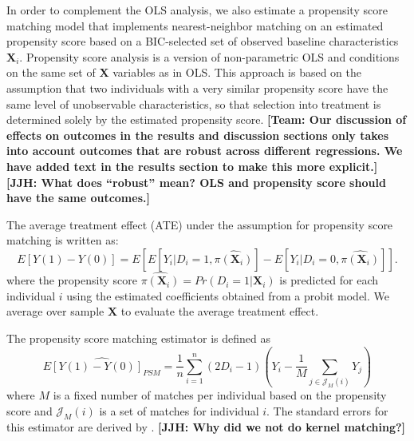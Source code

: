 In order to complement the OLS analysis, we also estimate a propensity score matching model that implements nearest-neighbor matching on an estimated propensity score based on a BIC-selected set of observed baseline characteristics $\boldsymbol{X}_i$. Propensity score analysis is a version of non-parametric OLS and conditions on the same set of $\bm{X}$ variables as in OLS. This approach is based on the assumption that two individuals with a very similar propensity score have the same level of unobservable characteristics, so that selection into treatment is determined solely by the estimated propensity score. \textbf{[Team: Our discussion of effects on outcomes in the results and discussion sections only takes into account outcomes that are robust across different regressions.  We have added text in the results section to make this more explicit.] [JJH: What does ``robust'' mean? OLS and propensity score should have the same outcomes.]} %

The average treatment effect (ATE) under the assumption for propensity score matching is written as:
\begin{equation} \label{eq:ATE-PSM}
E[Y(1)-Y(0)] = E[E[Y_i|D_i=1, \hat{\pi(\boldsymbol{X}_i)}] - E[Y_i|D_i=0, \hat{\pi(\boldsymbol{X}_i)}]].
\end{equation}
where the propensity score $\hat{\pi({\boldsymbol{X}_i})} = Pr(D_i=1|\boldsymbol{X}_i)$ is predicted for each individual $i$ using the estimated coefficients obtained from a probit model. We average over sample $\bm{X}$ to evaluate the average treatment effect.

The propensity score matching estimator is defined as
\begin{equation} \label{eq:PSM-estimator}
\widehat{E[Y(1)-Y(0)]_{PSM}} = \frac{1}{n} \sum_{i=1}^{n} (2D_i -1)(Y_i - \frac{1}{M}\sum_{j \in \mathcal{J}_M(i)}Y_j )
\end{equation}
where $M$ is a fixed number of matches per individual based on the propensity score and $\mathcal{J}_M(i)$ is a set of matches for individual $i$. The standard errors for this estimator are derived by \cite{Abadie_Imbens_2006_Econometrica}. \textbf{[JJH: Why did we not do kernel matching?]}

